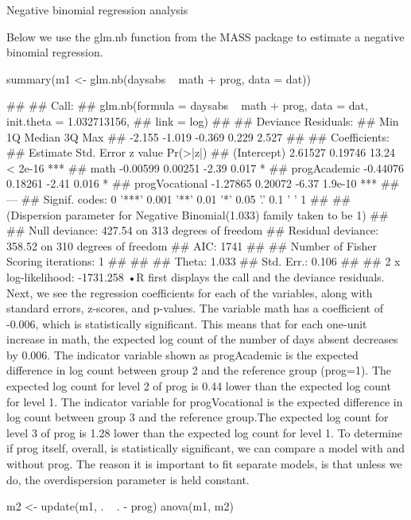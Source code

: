 Negative binomial regression analysis

Below we use the glm.nb function from the MASS package to estimate a negative binomial regression.



summary(m1 <- glm.nb(daysabs ~ math + prog, data = dat))

## 
## Call:
## glm.nb(formula = daysabs ~ math + prog, data = dat, init.theta = 1.032713156, 
##     link = log)
## 
## Deviance Residuals: 
##    Min      1Q  Median      3Q     Max  
## -2.155  -1.019  -0.369   0.229   2.527  
## 
## Coefficients:
##                Estimate Std. Error z value Pr(>|z|)    
## (Intercept)     2.61527    0.19746   13.24  < 2e-16 ***
## math           -0.00599    0.00251   -2.39    0.017 *  
## progAcademic   -0.44076    0.18261   -2.41    0.016 *  
## progVocational -1.27865    0.20072   -6.37  1.9e-10 ***
## ---
## Signif. codes:  0 '***' 0.001 '**' 0.01 '*' 0.05 '.' 0.1 ' ' 1
## 
## (Dispersion parameter for Negative Binomial(1.033) family taken to be 1)
## 
##     Null deviance: 427.54  on 313  degrees of freedom
## Residual deviance: 358.52  on 310  degrees of freedom
## AIC: 1741
## 
## Number of Fisher Scoring iterations: 1
## 
## 
##               Theta:  1.033 
##           Std. Err.:  0.106 
## 
##  2 x log-likelihood:  -1731.258
•R first displays the call and the deviance residuals. Next, we see the regression coefficients for each of the variables, along with standard errors, z-scores, and p-values. The variable math has a coefficient of -0.006, which is statistically significant. This means that for each one-unit increase in math, the expected log count of the number of days absent decreases by 0.006. The indicator variable shown as progAcademic is the expected difference in log count between group 2 and the reference group (prog=1). The expected log count for level 2 of prog is 0.44 lower than the expected log count for level 1. The indicator variable for progVocational is the expected difference in log count between group 3 and the reference group.The expected log count for level 3 of prog is 1.28 lower than the expected log count for level 1. To determine if prog itself, overall, is statistically significant, we can compare a model with and without prog. The reason it is important to fit separate models, is that unless we do, the overdispersion parameter is held constant.



m2 <- update(m1, . ~ . - prog)
anova(m1, m2)

